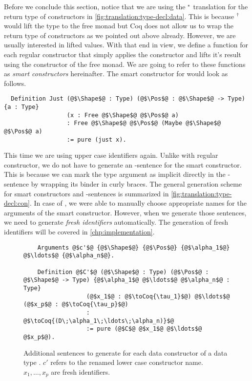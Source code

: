 Before we conclude this section, notice that we are using the ${}^{*}$ translation for the return type of constructors in \autoref{fig:translation:type-decl:data}.
This is because ${}^{\dagger}$ would lift the type to the free monad but Coq does not allow us to wrap the return type of constructors as we pointed out above already.
However, we are usually interested in lifted values.
With that end in view, we define a function for each regular constructor that simply applies the constructor and lifts it's result using the  constructor of the free monad.
We are going to refer to these functions as \textit{smart constructors} hereinafter.
The smart constructor for  would look as follows.
\begin{verbatim}
  Definition Just (@$\Shape$@ : Type) (@$\Pos$@ : @$\Shape$@ -> Type) {a : Type}
                  (x : Free @$\Shape$@ @$\Pos$@ a)
                  : Free @$\Shape$@ @$\Pos$@ (Maybe @$\Shape$@ @$\Pos$@ a)
                  := pure (just x).
\end{verbatim}
This time we are using upper case identifiers again.
Unlike with regular constructor, we do not have to generate an -sentence for the smart constructor.
This is because we can mark the type argument as implicit directly in the -sentence by wrapping its binder in curly braces.
The general generation scheme for smart constructors and -sentences is summarized in \autoref{fig:translation:type-decl:con}.
In case of , we were able to manually choose appropriate names for the arguments of the smart constructor.
However, when we generate those sentences, we need to generate \textit{fresh identifiers} automatically.
The generation of fresh identifiers will be covered in \autoref{chp:implementation}. %

\begin{figure}[H]
  \begin{verbatim}
    Arguments @$c'$@ {@$\Shape$@} {@$\Pos$@} {@$\alpha_1$@} @$\ldots$@ {@$\alpha_n$@}.

    Definition @$C'$@ (@$\Shape$@ : Type) (@$\Pos$@ : @$\Shape$@ -> Type) {@$\alpha_1$@ @$\ldots$@ @$\alpha_n$@ : Type}
                  (@$x_1$@ : @$\toCoq{\tau_1}$@) @$\ldots$@ (@$x_p$@ : @$\toCoq{\tau_p}$@)
                  : @$\toCoq{(D\;\alpha_1\;\ldots\;\alpha_n)}$@
                  := pure (@$C$@ @$x_1$@ @$\ldots$@ @$x_p$@).
  \end{verbatim}
  \caption{Additional sentences to generate for each data constructor  of a data type . $c'$ refers to the renamed lower case constructor name. $x_1, \ldots, x_p$ are fresh identifiers.}
  \label{fig:translation:type-decl:con}
\end{figure}

